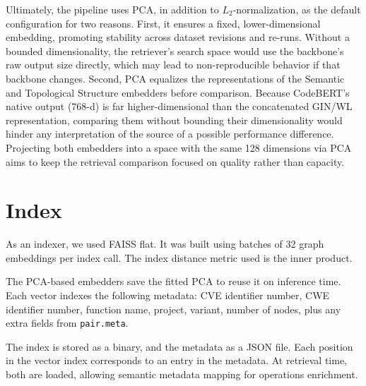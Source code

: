 Ultimately, the pipeline uses PCA, in addition to $L_2$-normalization, as the default configuration for two reasons. 
First, it ensures a fixed, lower-dimensional embedding, promoting stability across dataset revisions and re-runs.
Without a bounded dimensionality, the retriever's search space would use the backbone's raw output size directly, which may lead to non-reproducible behavior if that backbone changes. 
Second, PCA equalizes the representations of the Semantic and Topological Structure embedders before comparison. 
Because CodeBERT's native output (768-d) is far higher-dimensional than the concatenated GIN/WL representation, comparing them without bounding their dimensionality would hinder any interpretation of the source of a possible performance difference. 
Projecting both embedders into a space with the same 128 dimensions via PCA aims to keep the retrieval comparison focused on quality rather than capacity.

\section{Index}
As an indexer, we used FAISS flat. It was built using batches of 32 graph embeddings per index call. 
The index distance metric used is the inner product.
 

The PCA-based embedders save the fitted PCA to reuse it on inference time. Each vector indexes the following metadata: CVE identifier number, CWE identifier number, function name, project, variant, number of nodes, plus any extra fields from \texttt{pair.meta}. 

The index is stored as a binary, and the metadata as a JSON file. Each position in the vector index corresponds to an entry in the metadata. At retrieval time, both are loaded, allowing semantic metadata mapping for operations enrichment.

